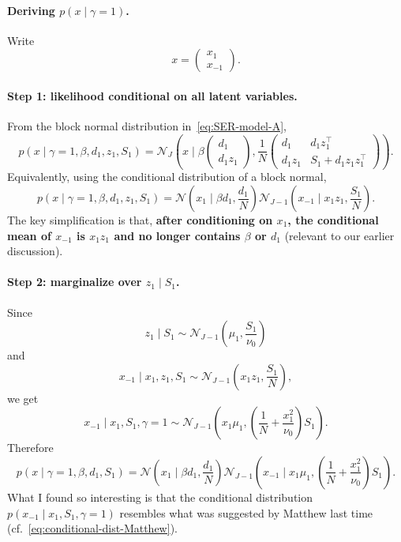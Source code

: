 \documentclass[11pt]{article}
\newcommand{\Normal}{\mathcal N}
\begin{document}
\paragraph{Deriving $p(x\mid \gamma=1)$.}
Write
\[
x=\begin{pmatrix}x_1\\x_{-1}\end{pmatrix}.
\]
\paragraph{Step 1: likelihood conditional on all latent variables.}
From the block normal distribution in~\eqref{eq:SER-model-A},
\[
p(x\mid \gamma=1,\beta,d_1,z_1,S_1)
=
\Normal_J\left(
x\mid
\beta
\begin{pmatrix}
d_1\\ d_1z_1
\end{pmatrix},
\frac{1}{N}
\begin{pmatrix}
d_1 & d_1z_1^\top\\
d_1z_1 & S_1+d_1z_1z_1^\top
\end{pmatrix}
\right).
\]
Equivalently, using the conditional distribution of a block normal,
\[
p(x\mid \gamma=1,\beta,d_1,z_1,S_1)
=
\Normal\left(x_1\mid \beta d_1,\frac{d_1}{N}\right)
\Normal_{J-1}\left(x_{-1}\mid x_1z_1,\frac{S_1}{N}\right).
\]
The key simplification is that, \textbf{after conditioning on $x_1$, the conditional
mean of $x_{-1}$ is $x_1z_1$ and no longer contains $\beta$ or $d_1$} (relevant to our earlier discussion).

\paragraph{Step 2: marginalize over $z_1\mid S_1$.}
Since
\[
z_1\mid S_1\sim \Normal_{J-1}\left(\mu_1,\frac{S_1}{\nu_0}\right)
\]
and
\[
x_{-1}\mid x_1,z_1,S_1
\sim
\Normal_{J-1}\left(x_1z_1,\frac{S_1}{N}\right),
\]
we get
\begin{equation}\label{eq:conditional-dist-susie-love}
x_{-1}\mid x_1,S_1,\gamma=1
\sim
\Normal_{J-1}\left(
x_1\mu_1,
\left(\frac{1}{N}+\frac{x_1^2}{\nu_0}\right)S_1
\right).
\end{equation}
Therefore
\[
p(x\mid \gamma=1,\beta,d_1,S_1)
=
\Normal\left(x_1\mid \beta d_1,\frac{d_1}{N}\right)
\Normal_{J-1}\left(
x_{-1}\mid x_1\mu_1,
\left(\frac{1}{N}+\frac{x_1^2}{\nu_0}\right)S_1
\right).
\]
What I found so interesting is that the conditional distribution $p(x_{-1}\mid x_1,S_1,\gamma=1)$ resembles what was suggested by Matthew last time (cf.~\eqref{eq:conditional-dist-Matthew}).
\end{document}
